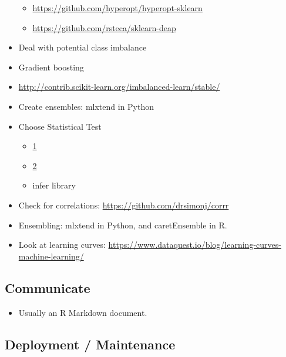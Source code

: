 \documentclass[]{book}
\providecommand{\tightlist}{%
  \setlength{\itemsep}{0pt}\setlength{\parskip}{0pt}}
\theoremstyle{definition}
\theoremstyle{definition}
\theoremstyle{definition}
\theoremstyle{remark}
\begin{document}
\begin{itemize}
  \begin{itemize}
  \tightlist
  \item
    \url{https://github.com/hyperopt/hyperopt-sklearn}
  \item
    \url{https://github.com/rsteca/sklearn-deap}
  \end{itemize}
\item
  Deal with potential class imbalance
\item
  Gradient boosting
\item
  \url{http://contrib.scikit-learn.org/imbalanced-learn/stable/}
\item
  Create ensembles: mlxtend in Python
\item
  Choose Statistical Test

  \begin{itemize}
  \tightlist
  \item
    \href{http://www.ats.ucla.edu/stat/mult_pkg/whatstat/}{1}
  \item
    \href{http://www.qnamarkup.org/i/?source=http://colarusso.github.io/QnAMarkup/examples/source/WhatStats.txt}{2}
  \item
    infer library
  \end{itemize}
\item
  Check for correlations: \url{https://github.com/drsimonj/corrr}
\item
  Ensembling: mlxtend in Python, and caretEnsemble in R.
\item
  Look at learning curves:
  \url{https://www.dataquest.io/blog/learning-curves-machine-learning/}
\end{itemize}

\subsection{Communicate}\label{communicate}

\begin{itemize}
\tightlist
\item
  Usually an R Markdown document.
\end{itemize}

\subsection{Deployment / Maintenance}\label{deployment-maintenance}
\end{document}
